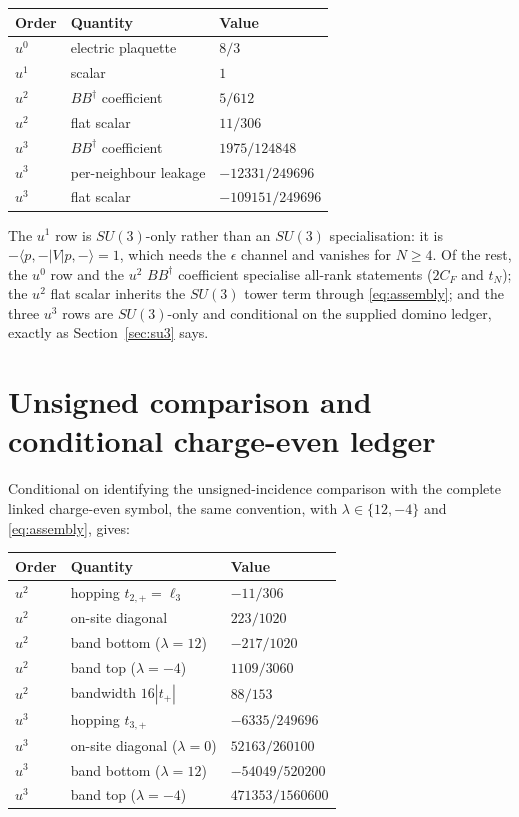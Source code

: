 \documentclass[11pt]{article}
\theoremstyle{plain}
\theoremstyle{definition}
\theoremstyle{remark}
\newcommand{\chk}[1]{}
\newcommand{\CF}{C_F}
\newcommand{\dg}{^{\dagger}}
\begin{document}
\begin{center}
\begin{tabular}{@{}lll@{}}
\toprule
Order & Quantity & Value\\
\midrule
$u^0$ & electric plaquette & $8/3$\\
$u^1$ & scalar & $1$\\
$u^2$ & $BB\dg$ coefficient & $5/612$\\
$u^2$ & flat scalar & $11/306$\\
$u^3$ & $BB\dg$ coefficient & $1975/124848$\\
$u^3$ & per-neighbour leakage & $-12331/249696$\\
$u^3$ & flat scalar & $-109151/249696$\\
\bottomrule
\end{tabular}
\end{center}
\chk{the manuscript's SU(3) ledger is this registry, value by value}

The $u^1$ row is $SU(3)$-only rather than an $SU(3)$ specialisation: it is
$-\langle p,-|V|p,-\rangle=1$, which needs the $\epsilon$ channel and vanishes
for $N\ge4$. Of the rest, the $u^0$ row and the $u^2$ $BB\dg$ coefficient
specialise all-rank statements ($2\CF$ and $t_N$); the $u^2$ flat scalar
inherits the $SU(3)$ tower term through \eqref{eq:assembly}; and the three
$u^3$ rows are $SU(3)$-only and conditional on the supplied domino ledger,
exactly as Section~\ref{sec:su3} says.

\section{Unsigned comparison and conditional charge-even ledger}\label{app:even}

Conditional on identifying the unsigned-incidence comparison with the complete
linked charge-even symbol, the same convention, with
$\lambda\in\{12,-4\}$ and \eqref{eq:assembly}, gives:

\begin{center}
\begin{tabular}{@{}lll@{}}
\toprule
Order & Quantity & Value\\
\midrule
$u^2$ & hopping $t_{2,+}=\ell_3$ & $-11/306$\\
$u^2$ & on-site diagonal & $223/1020$\\
$u^2$ & band bottom ($\lambda=12$) & $-217/1020$\\
$u^2$ & band top ($\lambda=-4$) & $1109/3060$\\
$u^2$ & bandwidth $16|t_+|$ & $88/153$\\
$u^3$ & hopping $t_{3,+}$ & $-6335/249696$\\
$u^3$ & on-site diagonal ($\lambda=0$) & $52163/260100$\\
$u^3$ & band bottom ($\lambda=12$) & $-54049/520200$\\
$u^3$ & band top ($\lambda=-4$) & $471353/1560600$\\
\bottomrule
\end{tabular}
\end{center}
\end{document}
